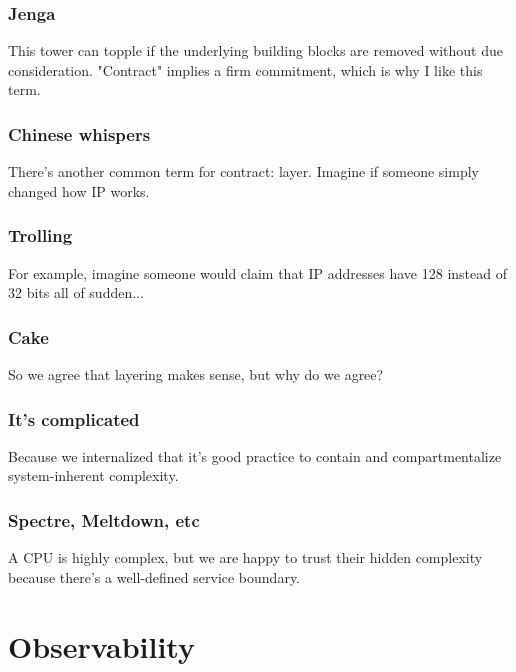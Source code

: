 \documentclass[aspectratio=169]{beamer}
\begin{document}
\begin{frame}
	\frametitle{Jenga}
	\begin{center}
		\vfill
		This tower can topple if the underlying building blocks are removed without due consideration.
		\vfill
		"Contract" implies a firm commitment, which is why I like this term.
		\vfill
	\end{center}
\end{frame}

\begin{frame}
	\frametitle{Chinese whispers}
	\begin{center}
		\vfill
		There's another common term for contract: layer.
		\vfill
		Imagine if someone simply changed how IP works.
		\vfill
	\end{center}
\end{frame}

\begin{frame}
	\frametitle{Trolling}
	\begin{center}
		\vfill
		For example, imagine someone would claim that IP addresses have 128 instead of 32 bits all of sudden...
		\vfill
	\end{center}
\end{frame}

\begin{frame}
	\frametitle{Cake}
	\begin{center}
		\vfill
		So we agree that layering makes sense, but why do we agree?
		\vfill
	\end{center}
\end{frame}

\begin{frame}
	\frametitle{It's complicated}
	\begin{center}
		\vfill
		Because we internalized that it's good practice to contain and compartmentalize system-inherent complexity.
		\vfill
	\end{center}
\end{frame}

\begin{frame}
	\frametitle{Spectre, Meltdown, etc}
	\begin{center}
		\vfill
		A CPU is highly complex, but we are happy to trust their hidden complexity because there's a well-defined service boundary.
		\vfill
	\end{center}
\end{frame}



\section{Observability}
\end{document}
